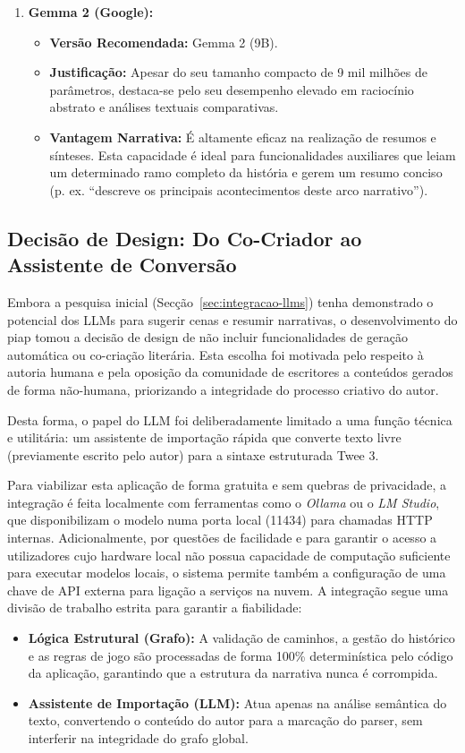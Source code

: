 \begin{enumerate}
    \item \textbf{Gemma 2 (Google):}
    \begin{itemize}
        \item \textbf{Versão Recomendada:} Gemma 2 (9B).
        \item \textbf{Justificação:} Apesar do seu tamanho compacto de 9 mil milhões de parâmetros, destaca-se pelo seu desempenho elevado em raciocínio abstrato e análises textuais comparativas.
        \item \textbf{Vantagem Narrativa:} É altamente eficaz na realização de resumos e sínteses. Esta capacidade é ideal para funcionalidades auxiliares que leiam um determinado ramo completo da história e gerem um resumo conciso (p. ex. ``descreve os principais acontecimentos deste arco narrativo'').
    \end{itemize}
\end{enumerate}

\subsection{Decisão de Design: Do Co-Criador ao Assistente de Conversão}
Embora a pesquisa inicial (Secção~\ref{sec:integracao-llms}) tenha demonstrado o potencial dos LLMs para sugerir cenas e resumir narrativas, o desenvolvimento do \gls{piap} tomou a decisão de design de não incluir funcionalidades de geração automática ou co-criação literária. Esta escolha foi motivada pelo respeito à autoria humana e pela oposição da comunidade de escritores a conteúdos gerados de forma não-humana, priorizando a integridade do processo criativo do autor.

Desta forma, o papel do LLM foi deliberadamente limitado a uma função técnica e utilitária: um assistente de importação rápida que converte texto livre (previamente escrito pelo autor) para a sintaxe estruturada Twee 3. 

Para viabilizar esta aplicação de forma gratuita e sem quebras de privacidade, a integração é feita localmente com ferramentas como o \textit{Ollama} ou o \textit{LM Studio}, que disponibilizam o modelo numa porta local (11434) para chamadas HTTP internas. Adicionalmente, por questões de facilidade e para garantir o acesso a utilizadores cujo hardware local não possua capacidade de computação suficiente para executar modelos locais, o sistema permite também a configuração de uma chave de API externa para ligação a serviços na nuvem. A integração segue uma divisão de trabalho estrita para garantir a fiabilidade:

\begin{itemize}
    \item \textbf{Lógica Estrutural (Grafo):} A validação de caminhos, a gestão do histórico e as regras de jogo são processadas de forma 100\% determinística pelo código da aplicação, garantindo que a estrutura da narrativa nunca é corrompida.
    \item \textbf{Assistente de Importação (LLM):} Atua apenas na análise semântica do texto, convertendo o conteúdo do autor para a marcação do parser, sem interferir na integridade do grafo global.
\end{itemize}